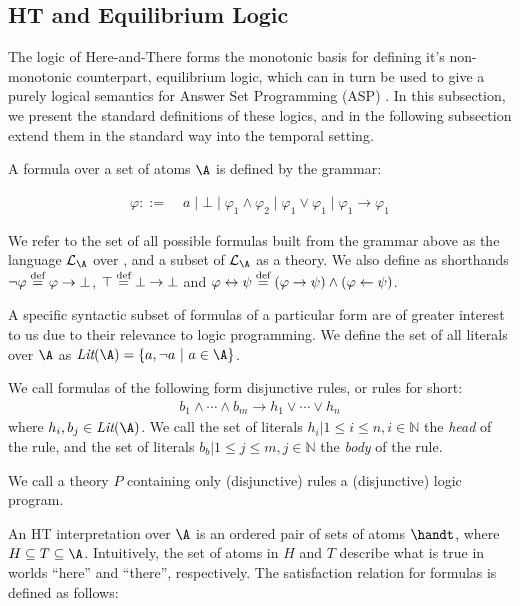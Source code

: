 \subsection{HT and Equilibrium Logic}

The logic of Here-and-There forms the monotonic basis for defining
it's non-monotonic counterpart, equilibrium logic, which can in turn
be used to give a purely logical semantics for Answer Set Programming
(ASP) \cite{pearce06a}. In this subsection, we present the standard
definitions of these logics, and in the following subsection extend
them in the standard way into the temporal setting.

A formula over a set of atoms $\A$ is defined by the grammar:

\begin{align*}
    \varphi ::= &\; a \mid \bot \mid
                  \varphi_1 \wedge \varphi_2 \mid
                  \varphi_1 \vee \varphi_1 \mid
                  \varphi_1 \to \varphi_1
\end{align*}

We refer to the set of all possible formulas built from the grammar above as the language $\mathcal{L}_\A$ over \A, and a subset of $\mathcal{L}_\A$ as a theory.
We also define as shorthands $\neg \varphi \stackrel{\text{def}}{=} \varphi \to \bot$, 
$\top \stackrel{\text{def}}{=} \bot \to \bot$ and $\varphi \leftrightarrow \psi \stackrel{\text{def}}{=} (\varphi \rightarrow \psi) \wedge (\varphi \leftarrow \psi)$.

A specific syntactic subset of formulas of a particular form are of
greater interest to us due to their relevance to logic programming.
We define the set of all literals over $\A$ as
$\textit{Lit}(\A) = \{ a, \lnot a\ |\ a \in \A \}$.

\begin{definition}
    We call formulas of the following form disjunctive rules, or rules for short:
\begin{align*}
  b_{1} \wedge \cdots \wedge b_{m} \rightarrow h_1 \vee \cdots \vee h_{n}
\end{align*}
where $h_{i}, b_{j} \in \textit{Lit}(\A)$. We call the set of literals ${ h_i | 1 \leq i \leq n, i\in \mathbb{N}}$ the \emph{head} of the rule, and the set of literals ${ b_b | 1 \leq j \leq m, j \in \mathbb{N}}$ the \emph{body} of the rule.
\end{definition}

We call a theory $P$ containing only (disjunctive) rules a
(disjunctive) logic program.

An HT interpretation over $\A$ is an ordered pair of sets of atoms
$\handt$, where $H \subseteq T \subseteq \A$. Intuitively, the set of
atoms in $H$ and $T$ describe what is true in worlds ``here'' and
``there'', respectively. The satisfaction relation for formulas is
defined as follows:

